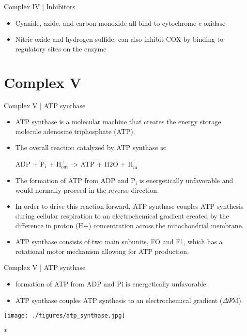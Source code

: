 \documentclass[presentation, smaller]{beamer}
\begin{document}
\begin{frame}[label={sec:org9dbddb4}]{Complex IV | Inhibitors}
\begin{itemize}
\item Cyanide, azide, and carbon monoxide all bind to cytochrome c
oxidase

\item Nitric oxide and hydrogen sulfide, can also inhibit COX by
binding to regulatory sites on the enzyme
\end{itemize}
\end{frame}

\section{Complex V}
\label{sec:org137af43}
\begin{frame}[label={sec:org4717d44}]{Complex V | ATP synthase}
\begin{itemize}
\item ATP synthase is a molecular machine that creates the energy storage
molecule adenosine triphosphate (ATP).

\item The overall reaction catalyzed by ATP synthase is:

ADP + P\(_{\text{i}}\) + H\(^{\text{+}}_{\text{out}}\) -> ATP + H2O + H\(^{\text{+}}_{\text{in}}\)

\item The formation of ATP from ADP and P\(_{\text{i}}\) is energetically unfavorable
and would normally proceed in the reverse direction.

\item In order to drive this reaction forward, ATP synthase couples ATP synthesis
during cellular respiration to an electrochemical gradient created
by the difference in proton (H+) concentration across the
mitochondrial membrane.

\item ATP synthase consists of two main subunits, FO and F1, which has a
rotational motor mechanism allowing for ATP production.
\end{itemize}
\end{frame}

\begin{frame}[label={sec:orgf2298ac}]{Complex V | ATP synthase}
\begin{itemize}
\item formation of ATP from ADP and Pi is energetically unfavorable
\item ATP synthase couples ATP synthesis to an electrochemical gradient (\(\Delta \Psi\)M).
\end{itemize}

\begin{center}
\texttt{[image: ./figures/atp\_synthase.jpg]}
\label{orgeac5320}
\end{center}

\centering
{}
*
\end{frame}
\end{document}
